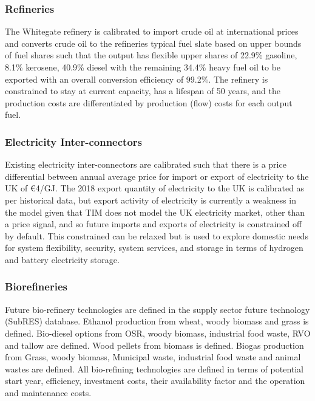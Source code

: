 \documentclass[journal abbreviation, manuscript]{copernicus}
\begin{document}
\subsubsection{Refineries}
The Whitegate refinery is calibrated to import crude oil at international prices and converts crude oil to the refineries typical fuel slate based on upper bounds of fuel shares such that the output has flexible upper shares of 22.9\% gasoline, 8.1\% kerosene, 40.9\% diesel with the remaining 34.4\% heavy fuel oil to be exported with an overall conversion efficiency of 99.2\%. The refinery is constrained to stay at current capacity, has a lifespan of 50 years, and the production costs are differentiated by production (flow) costs for each output fuel.

\subsubsection{Electricity Inter-connectors}
Existing electricity inter-connectors are calibrated such that there is a price differential between annual average price for import or export of electricity to the UK of \euro{4}/GJ. The 2018 export quantity of electricity to the UK is calibrated as per historical data, but export activity of electricity is currently a weakness in the model given that TIM does not model the UK electricity market, other than a price signal, and so future imports and exports of electricity is constrained off by default. This constrained can be relaxed but is used to explore domestic needs for system flexibility, security, system services, and storage in terms of hydrogen and battery electricity storage.

\subsubsection{Biorefineries}
Future bio-refinery technologies are defined in the supply sector future technology (SubRES) database. Ethanol production from wheat, woody biomass and grass is defined. Bio-diesel options from OSR, woody biomass, industrial food waste, RVO and tallow are defined. Wood pellets from biomass is defined. Biogas production from Grass, woody biomass, Municipal waste, industrial food waste and animal wastes are defined. All bio-refining technologies are defined in terms of potential start year, efficiency, investment costs, their availability factor and the operation and maintenance costs.
\end{document}
